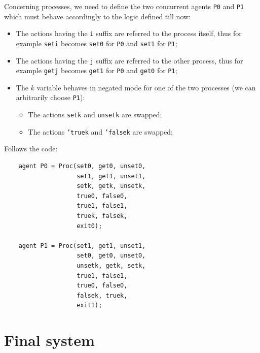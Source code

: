 \documentclass[10pt,a4paper]{article}
\newcommand{\CCSCode}[1]{{\tt #1}}
\newcommand{\Agent}[1]{{\tt {#1}}}
\begin{document}
        Concerning processes, we need to define the two concurrent agents
        \Agent{P0} and \Agent{P1} which must behave accordingly to
        the logic defined till now:
        \begin{itemize}

        \item   The actions having the \CCSCode{i} suffix are referred to
                the process itself, thus for example \CCSCode{seti}
                becomes \CCSCode{set0} for \Agent{P0} and
                \CCSCode{set1} for \Agent{P1};

        \item   The actions having the \CCSCode{j} suffix are referred to
                the other process, thus for example \CCSCode{getj} becomes
                \CCSCode{get1} for \Agent{P0} and \CCSCode{get0} for
                \Agent{P1};

        \item   The $k$ variable behaves in negated mode for one of the two
                processes (we can arbitrarily choose \Agent{P1}):

            \begin{itemize}

            \item   The actions \CCSCode{setk} and \CCSCode{unsetk} are
                    swapped;
            \item   The actions \CCSCode{'truek} and \CCSCode{'falsek} are
                    swapped;

            \end{itemize}

        \end{itemize}

        Follows the code:
        \begin{verbatim}
    agent P0 = Proc(set0, get0, unset0,
                    set1, get1, unset1,
                    setk, getk, unsetk,
                    true0, false0,
                    true1, false1,
                    truek, falsek,
                    exit0);

    agent P1 = Proc(set1, get1, unset1,
                    set0, get0, unset0,
                    unsetk, getk, setk,
                    true1, false1,
                    true0, false0,
                    falsek, truek,
                    exit1);
        \end{verbatim}

\section{Final system}
\end{document}
